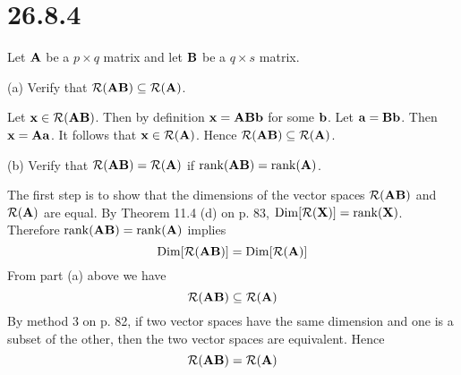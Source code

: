 \section*{26.8.4}
Let $\bf A$ be a $p\times q$ matrix and let $\bf B$ be a $q\times s$
matrix.

\bigskip
\noindent
(a) Verify that ${\cal R}({\bf AB})\subseteq{\cal R}({\bf A})$.

\bigskip
\noindent
Let ${\bf x}\in{\cal R}({\bf AB})$.
Then by definition ${\bf x}={\bf ABb}$ for some $\bf b$.
Let ${\bf a}={\bf Bb}$.
Then ${\bf x}={\bf Aa}$.
It follows that ${\bf x}\in{\cal R}({\bf A})$.
Hence ${\cal R}({\bf AB})\subseteq{\cal R}({\bf A})$.

\bigskip
\noindent
(b) Verify that ${\cal R}({\bf AB})={\cal R}({\bf A})$
if $\mathop{\rm rank}({\bf AB})=\mathop{\rm rank}({\bf A})$.

\bigskip
\noindent
The first step is to show that the dimensions of the vector spaces
${\cal R}({\bf AB})$ and ${\cal R}({\bf A})$ are equal.
By Theorem 11.4 (d) on p. 83,
$\mathop{\rm Dim}[{\cal R}({\bf X})]=\mathop{\rm rank}({\bf X})$.
Therefore
$\mathop{\rm rank}({\bf AB})=\mathop{\rm rank}({\bf A})$
implies
$$\mathop{\rm Dim}[{\cal R}({\bf AB})]
=\mathop{\rm Dim}[{\cal R}({\bf A})]
$$
From part (a) above we have
$${\cal R}({\bf AB})\subseteq{\cal R}({\bf A})$$
By method 3 on p. 82, if two vector spaces have the same dimension
and one is a subset of the other, then the two vector spaces
are equivalent. Hence
$${\cal R}({\bf AB})={\cal R}({\bf A})$$
